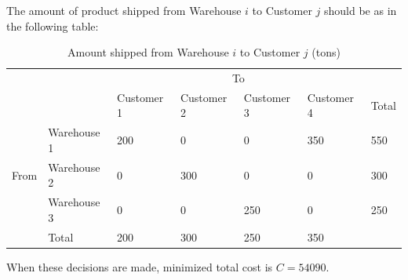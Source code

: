 \documentclass{article}
\begin{document}
The amount of product shipped from Warehouse $i$ to Customer $j$ should be as in the following table:

\begin{table}[!ht]
    \caption{Amount shipped from Warehouse $i$ to Customer $j$ (tons)}
    \begin{tabular}{ll|lllll}
    \cline{3-6}
                               &             & \multicolumn{4}{c|}{To}                                                                                                                                            \\ \cline{2-7} 
    \multicolumn{1}{l|}{}      &             & \multicolumn{1}{l|}{Customer 1} & \multicolumn{1}{l|}{Customer 2} & \multicolumn{1}{l|}{Customer 3} & \multicolumn{1}{l|}{Customer 4} & \multicolumn{1}{l|}{Total} \\ \hline
    \multicolumn{1}{|l|}{}     & Warehouse 1 & \multicolumn{1}{l|}{200}        & \multicolumn{1}{l|}{0}          & \multicolumn{1}{l|}{0}          & \multicolumn{1}{l|}{350}        & \multicolumn{1}{l|}{550}   \\ \cline{2-7} 
    \multicolumn{1}{|l|}{From} & Warehouse 2 & \multicolumn{1}{l|}{0}          & \multicolumn{1}{l|}{300}        & \multicolumn{1}{l|}{0}          & \multicolumn{1}{l|}{0}          & \multicolumn{1}{l|}{300}   \\ \cline{2-7} 
    \multicolumn{1}{|l|}{}     & Warehouse 3 & \multicolumn{1}{l|}{0}          & \multicolumn{1}{l|}{0}          & \multicolumn{1}{l|}{250}        & \multicolumn{1}{l|}{0}          & \multicolumn{1}{l|}{250}   \\ \hline
    \multicolumn{1}{l|}{}      & Total       & \multicolumn{1}{l|}{200}        & \multicolumn{1}{l|}{300}        & \multicolumn{1}{l|}{250}        & \multicolumn{1}{l|}{350}        &                            \\ \cline{2-6}
    \end{tabular}
\end{table}

When these decisions are made, minimized total cost is $C = 54090$.
\end{document}
